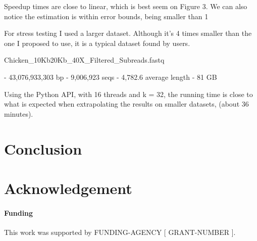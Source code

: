 \documentclass{bioinfo}
\begin{document}
Speedup times are close to linear,
which is best seem on Figure 3.
We can also notice the estimation is within error bounds,
being smaller than 1%

For stress testing I used a larger dataset.
Although it's 4 times smaller than the one I proposed to use,
it is a typical dataset found by users.

Chicken\_10Kb20Kb\_40X\_Filtered\_Subreads.fastq

  - 43,076,933,303 bp
  - 9,006,923 seqs
  - 4,782.6 average length
  - 81 GB

Using the Python API, with 16 threads and k = 32,
the running time is close to what is expected when extrapolating the
results on smaller datasets,
(about 36 minutes).


\section{Conclusion}

\section*{Acknowledgement}

\paragraph{Funding\textcolon} This work was supported by FUNDING-AGENCY [ GRANT-NUMBER ].


%
%
%
%
%
%
%

\end{document}
